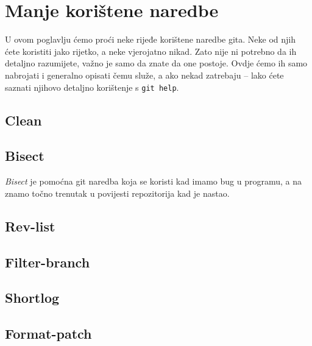 \chapter*{Manje korištene naredbe}

U ovom poglavlju ćemo proći neke rijeđe korištene naredbe gita.
Neke od njih ćete koristiti jako rijetko, a neke vjerojatno nikad.
Zato nije ni potrebno da ih detaljno razumijete, važno je samo da znate da one postoje. 
Ovdje ćemo ih samo nabrojati i generalno opisati čemu služe, a ako nekad zatrebaju -- lako ćete saznati njihovo detaljno korištenje s \verb+git help+.

\section*{Clean}

\section*{Bisect}

\emph{Bisect} je pomoćna git naredba koja se koristi kad imamo bug u programu, a na znamo točno trenutak u povijesti repozitorija kad je nastao.

\TODO

\section*{Rev-list}

\TODO

\section*{Filter-branch}

\TODO

\section*{Shortlog}

\TODO

\section*{Format-patch}

